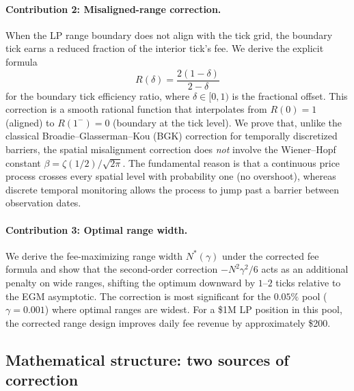 \documentclass[11pt]{article}
\theoremstyle{definition}
\theoremstyle{remark}
\begin{document}
\paragraph{Contribution 2: Misaligned-range correction.}
When the LP range boundary does not align with the tick grid, the
boundary tick earns a reduced fraction of the interior tick's fee. We
derive the explicit formula
\[
R(\delta) = \frac{2(1-\delta)}{2-\delta}
\]
for the boundary tick efficiency ratio, where $\delta \in [0,1)$ is
the fractional offset. This correction is a smooth rational function
that interpolates from $R(0) = 1$ (aligned) to $R(1^-) = 0$
(boundary at the tick level). We prove that, unlike the classical
Broadie--Glasserman--Kou (BGK) correction for temporally discretized
barriers, the spatial misalignment correction does \emph{not} involve
the Wiener--Hopf constant $\beta = \zeta(1/2)/\sqrt{2\pi}$. The
fundamental reason is that a continuous price process crosses every
spatial level with probability one (no overshoot), whereas discrete
temporal monitoring allows the process to jump past a barrier between
observation dates.

\paragraph{Contribution 3: Optimal range width.}
We derive the fee-maximizing range width $N^*(\gamma)$ under the
corrected fee formula and show that the second-order correction
$-N^2\gamma^2/6$ acts as an additional penalty on wide ranges,
shifting the optimum downward by $1$--$2$ ticks relative to the EGM
asymptotic. The correction is most significant for the $0.05\%$ pool
($\gamma = 0.001$) where optimal ranges are widest. For a \$1M LP
position in this pool, the corrected range design improves daily fee
revenue by approximately \$200.

\subsection{Mathematical structure: two sources of correction}
\end{document}
